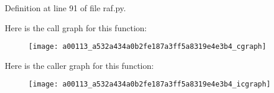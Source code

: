 Definition at line 91 of file raf.\-py.



Here is the call graph for this function\-:\nopagebreak
\begin{figure}[H]
\begin{center}
\leavevmode
\texttt{[image: a00113\_a532a434a0b2fe187a3ff5a8319e4e3b4\_cgraph]}
\end{center}
\end{figure}




Here is the caller graph for this function\-:\nopagebreak
\begin{figure}[H]
\begin{center}
\leavevmode
\texttt{[image: a00113\_a532a434a0b2fe187a3ff5a8319e4e3b4\_icgraph]}
\end{center}
\end{figure}


